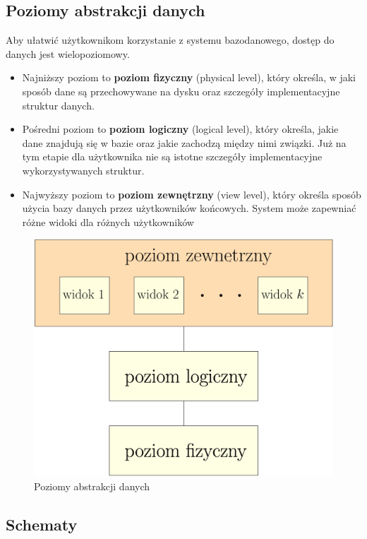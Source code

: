 \subsection{Poziomy abstrakcji danych}

Aby ułatwić użytkownikom korzystanie z systemu bazodanowego, dostęp do danych jest wielopoziomowy.

\begin{itemize}
    \item Najniższy poziom to \textbf{poziom fizyczny} (physical level), który określa, w jaki sposób dane są przechowywane na dysku oraz szczegóły implementacyjne struktur danych.
    \item Pośredni poziom to \textbf{poziom logiczny} (logical level), który określa, jakie dane znajdują się w bazie oraz jakie zachodzą między nimi związki. Już na tym etapie dla użytkownika nie są istotne szczegóły implementacyjne wykorzystywanych struktur.
    \item Najwyższy poziom to \textbf{poziom zewnętrzny} (view level), który określa sposób użycia bazy danych przez użytkowników końcowych. System może zapewniać różne widoki dla różnych użytkowników
\end{itemize}

\begin{figure}[H]
    \centering
    \includegraphics[scale=0.25]{images/podstawowe/poziomy-abstrakcji.png}
    \caption{Poziomy abstrakcji danych}
\end{figure}

\subsection{Schematy}

